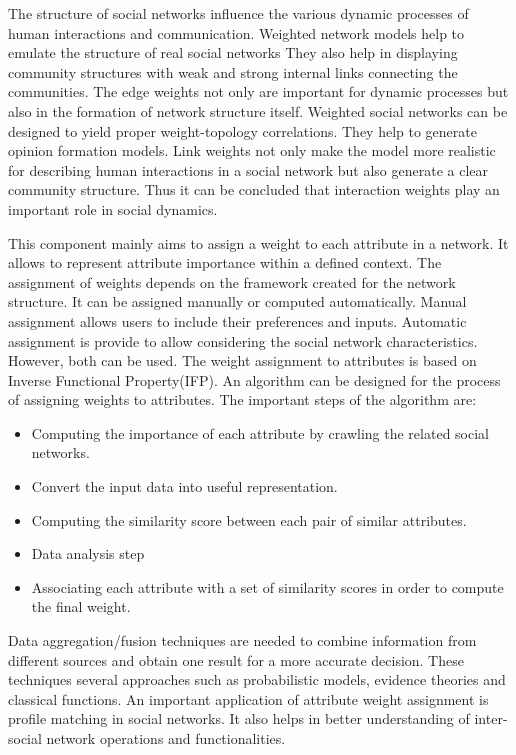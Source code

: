 
The structure of social networks influence the various dynamic processes of human interactions and communication. Weighted network models help to emulate the structure of real social networks They also help in displaying community structures with weak and strong internal links connecting the communities. The edge weights not only are important for dynamic processes but also in the formation of network structure itself. Weighted social networks can be designed to yield proper weight-topology correlations. They help to generate opinion formation models. Link weights not only make the model more realistic for describing human interactions in a social network but also generate a clear community structure. Thus it can be concluded that interaction weights play an important role in social dynamics. \cite{toivonen2007role}


This component mainly aims to assign a weight to each attribute in a network. It allows to represent attribute importance within a defined context. The assignment of weights depends on the framework created for the network structure. It can be assigned manually or computed automatically. Manual assignment allows users to include their preferences and inputs. Automatic assignment is provide to allow considering the social network characteristics. However, both can be used. The weight assignment to attributes is based on Inverse Functional Property(IFP). An algorithm can be designed for the process of assigning weights to attributes. The important steps of the algorithm are:

\begin{itemize}
\item Computing the importance of each attribute by crawling the related social networks.
\item Convert the input data into useful representation.
\item Computing the similarity score between each pair of similar attributes.
\item Data analysis step
\item Associating each attribute with a set of similarity scores in order to compute the final weight.
\end{itemize}

Data aggregation/fusion techniques are needed to combine information from different sources and obtain one result for a more accurate decision. These techniques several approaches such as probabilistic models, evidence theories and classical functions. An important application of attribute weight assignment is profile matching in social networks.  It also helps in better understanding of inter-social network operations and functionalities. \cite{raad2010user}

